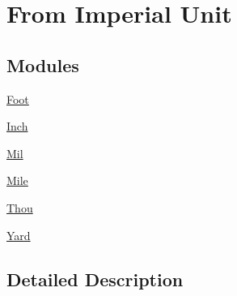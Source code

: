 \hypertarget{group___e_g_x_math-_conversions-_length_conversions-_imperial}{}\section{From Imperial Unit}
\label{group___e_g_x_math-_conversions-_length_conversions-_imperial}
\subsection*{Modules}
\begin{DoxyCompactItemize}
\item 
\mbox{\hyperlink{group___e_g_x_math-_conversions-_length_conversions-_imperial-_foot}{Foot}}
\item 
\mbox{\hyperlink{group___e_g_x_math-_conversions-_length_conversions-_imperial-_inch}{Inch}}
\item 
\mbox{\hyperlink{group___e_g_x_math-_conversions-_length_conversions-_imperial-_mil}{Mil}}
\item 
\mbox{\hyperlink{group___e_g_x_math-_conversions-_length_conversions-_imperial-_mile}{Mile}}
\item 
\mbox{\hyperlink{group___e_g_x_math-_conversions-_length_conversions-_imperial-_thou}{Thou}}
\item 
\mbox{\hyperlink{group___e_g_x_math-_conversions-_length_conversions-_imperial-_yard}{Yard}}
\end{DoxyCompactItemize}


\subsection{Detailed Description}
